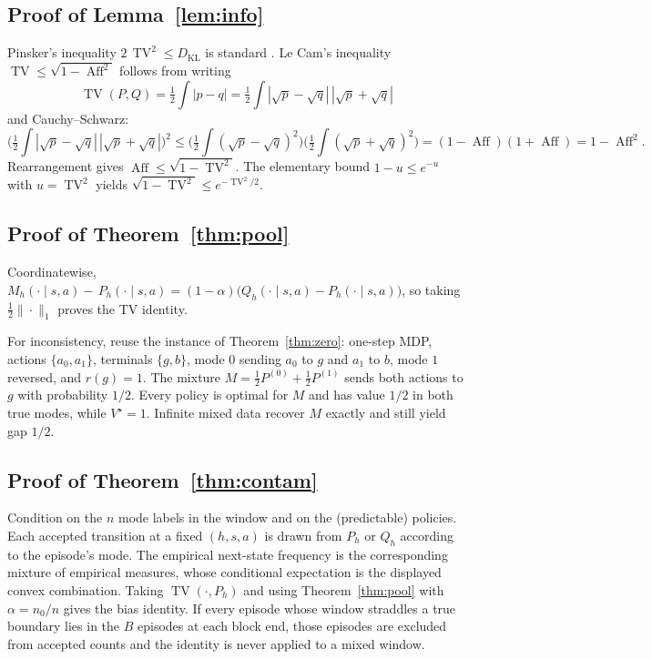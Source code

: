\documentclass[11pt]{article}
\newcommand{\Aff}{\operatorname{Aff}}
\newcommand{\TV}{\operatorname{TV}}
\newcommand{\KL}{D_{\mathrm{KL}}}
\begin{document}
\subsection{Proof of Lemma~\ref{lem:info}}
Pinsker's inequality $2\,\TV^2\le\KL$ is standard
\citep[Lemma~2.5]{tsybakov2009introduction}. Le Cam's inequality
$\TV\le\sqrt{1-\Aff^2}$ follows from writing
\[
\TV(P,Q)=\tfrac12\int |p-q|
=\tfrac12\int |\sqrt{p}-\sqrt{q}|\,|\sqrt{p}+\sqrt{q}|
\]
and Cauchy--Schwarz:
\[
\bigl(\tfrac12\int |\sqrt{p}-\sqrt{q}|\,|\sqrt{p}+\sqrt{q}|\bigr)^2
\le
\bigl(\tfrac12\int (\sqrt{p}-\sqrt{q})^2\bigr)
\bigl(\tfrac12\int (\sqrt{p}+\sqrt{q})^2\bigr)
=(1-\Aff)(1+\Aff)=1-\Aff^2.
\]
Rearrangement gives $\Aff\le\sqrt{1-\TV^2}$. The elementary bound
$1-u\le e^{-u}$ with $u=\TV^2$ yields $\sqrt{1-\TV^2}\le e^{-\TV^2/2}$.

\subsection{Proof of Theorem~\ref{thm:pool}}
Coordinatewise, $M_h(\cdot\mid s,a)-\,P_h(\cdot\mid s,a)
=(1-\alpha)\bigl(Q_h(\cdot\mid s,a)-P_h(\cdot\mid s,a)\bigr)$, so taking
$\tfrac12\|\cdot\|_1$ proves the TV identity.

For inconsistency, reuse the instance of Theorem~\ref{thm:zero}: one-step
MDP, actions $\{a_0,a_1\}$, terminals $\{g,b\}$, mode $0$ sending $a_0$ to
$g$ and $a_1$ to $b$, mode $1$ reversed, and $r(g)=1$. The mixture
$M=\tfrac12 P^{(0)}+\tfrac12 P^{(1)}$ sends both actions to $g$ with
probability $1/2$. Every policy is optimal for $M$ and has value $1/2$ in
both true modes, while $V^\star=1$. Infinite mixed data recover $M$ exactly
and still yield gap $1/2$.

\subsection{Proof of Theorem~\ref{thm:contam}}
Condition on the $n$ mode labels in the window and on the (predictable)
policies. Each accepted transition at a fixed $(h,s,a)$ is drawn from
$P_h$ or $Q_h$ according to the episode's mode. The empirical next-state
frequency is the corresponding mixture of empirical measures, whose
conditional expectation is the displayed convex combination. Taking
$\TV(\cdot,P_h)$ and using Theorem~\ref{thm:pool} with
$\alpha=n_0/n$ gives the bias identity. If every episode whose window
straddles a true boundary lies in the $B$ episodes at each block end, those
episodes are excluded from accepted counts and the identity is never
applied to a mixed window.
\end{document}
